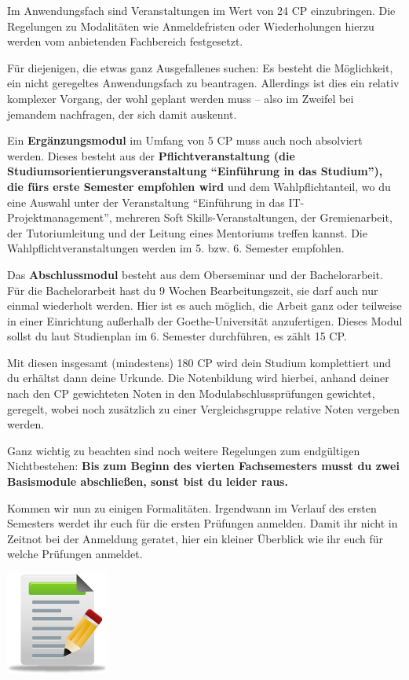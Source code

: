 Im Anwendungsfach sind Veranstaltungen im Wert von 24 CP einzubringen. Die Regelungen zu Modalitäten wie Anmeldefristen oder Wiederholungen hierzu werden vom anbietenden Fachbereich festgesetzt.

Für diejenigen, die etwas ganz Ausgefallenes suchen: Es besteht die Möglichkeit, ein nicht geregeltes Anwendungsfach zu beantragen. Allerdings ist dies ein relativ komplexer Vorgang, der wohl geplant werden muss – also im Zweifel bei jemandem nachfragen, der sich damit auskennt.

Ein \textbf{Ergänzungsmodul} im Umfang von 5 CP muss auch noch absolviert werden. Dieses besteht aus der \textbf{Pflichtveranstaltung (die Studiumsorientierungsveranstaltung ``Einführung in das Studium''), die fürs erste Semester empfohlen wird} und dem Wahlpflichtanteil, wo du eine Auswahl unter der Veranstaltung ``Einführung in das IT-Projektmanagement'', mehreren Soft Skills-Veranstaltungen, der Gremienarbeit, der Tutoriumleitung  und der Leitung eines Mentoriums treffen kannst. Die Wahlpflichtveranstaltungen werden im 5. bzw. 6. Semester empfohlen.

Das \textbf{Abschlussmodul} besteht aus dem Oberseminar und der Bachelorarbeit. Für die Bachelorarbeit hast du 9 Wochen Bearbeitungszeit, sie darf auch nur einmal wiederholt werden. Hier ist es auch möglich, die Arbeit ganz oder teilweise in einer Einrichtung außerhalb der Goethe-Universität anzufertigen. Dieses Modul sollst du laut Studienplan im 6. Semester durchführen, es zählt 15 CP.

Mit diesen insgesamt (mindestens) 180 CP wird dein Studium komplettiert und du erhältst dann deine Urkunde. Die Notenbildung wird hierbei, anhand deiner nach den CP gewichteten Noten in den  Modulabschlussprüfungen gewichtet, geregelt, wobei noch zusätzlich zu einer Vergleichsgruppe relative Noten vergeben werden.

Ganz wichtig zu beachten sind noch weitere Regelungen zum endgültigen Nichtbestehen: \textbf{Bis zum Beginn des vierten Fachsemesters musst du zwei Basismodule  abschließen, sonst bist du leider raus.}

Kommen wir nun zu einigen Formalitäten. Irgendwann im Verlauf des ersten Semesters werdet ihr euch für die ersten Prüfungen anmelden. Damit ihr nicht in Zeitnot bei der Anmeldung geratet, hier ein kleiner Überblick wie ihr euch für welche Prüfungen anmeldet.

\begin{center}
	\includegraphics[scale=0.8]{bitmaps/bachelor/tests_icon}
\end{center}

